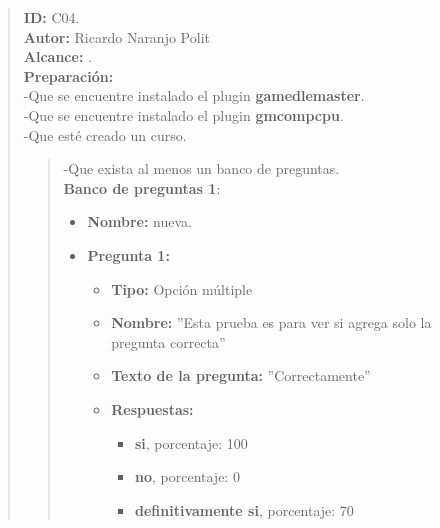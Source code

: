 
\begin{quote} %
	\textbf{ID:} C04.\\
    \textbf{Autor: } Ricardo Naranjo Polit\\
	\textbf{Alcance:}  .\\
    \textbf{Preparación:}\\
      -Que se encuentre instalado el plugin {\bf gamedlemaster}.\\
      -Que se encuentre instalado el plugin {\bf gmcompcpu}.\\
      -Que esté creado un curso.
      \begin{quote}
      -Que exista al menos un banco de preguntas.\\
      \textbf{Banco de preguntas 1}:
        	\begin{itemize} %
                \item \textbf{Nombre:} nueva.
                \item \textbf{Pregunta 1:}
                \begin{itemize}
                  \item \textbf{Tipo:} Opción múltiple
                  \item \textbf{Nombre:} ''Esta prueba es para ver si agrega solo la pregunta correcta''
                  \item \textbf{Texto de la pregunta:} ''Correctamente''
                  \item \textbf{Respuestas:}
                  \begin{itemize}
                    \item \textbf{si}, porcentaje: 100
                    \item \textbf{no}, porcentaje: 0
                    \item \textbf{definitivamente si}, porcentaje: 70
                  \end{itemize}
                \end{itemize}


\end{itemize}
\end{quote}
\end{quote}
